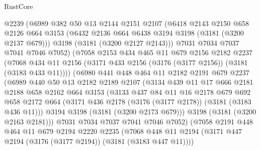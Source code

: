 \begin{lexlean}{RustCore}
\begin{coremodule}
            @2239
            (@6989
              @382
              @50
              @13
              @2144
              @2151
              @2107
              (@6418
                @2143
                @2150
                @658
                @2126
                @664
                @3153
                (@6432 @2136 @664 @6438 @3194 @3198 (@3181 (@3200 @2137 @679)))
                @3198
                (@3181 (@3200 @2127 @2143)))
              @7031
              @7034
              @7037
              @7041
              @7046
              @7052)
            (@7058
              @2153
              @434
              @465
              @11
              @679
              @2156
              @2182
              @2237
              (@7068
                @434
                @11
                @2156
                (@3171 @433 @2156 (@3176 (@3177 @2156)) (@3181 (@3183 @433 @11))))
              (@6980
                @441
                @448
                @464
                @11
                @2182
                @2191
                @679
                @2237
                (@6989
                  @440
                  @50
                  @13
                  @2182
                  @2189
                  @2107
                  (@3134
                    @439
                    @11
                    @17
                    @666
                    @2181
                    @2188
                    @658
                    @2162
                    @664
                    @3153
                    (@3133
                      @437
                      @84
                      @11
                      @16
                      @2178
                      @679
                      @692
                      @658
                      @2172
                      @664
                      (@3171 @436 @2178 (@3176 (@3177 @2178)) (@3181 (@3183 @436 @11)))
                      @3194
                      @3198
                      (@3181 (@3200 @2173 @679)))
                    @3198
                    (@3181 (@3200 @2163 @2181)))
                  @7031
                  @7034
                  @7037
                  @7041
                  @7046
                  @7052)
                (@7058
                  @2191
                  @448
                  @464
                  @11
                  @679
                  @2194
                  @2220
                  @2235
                  (@7068
                    @448
                    @11
                    @2194
                    (@3171 @447 @2194 (@3176 (@3177 @2194)) (@3181 (@3183 @447 @11))))

\end{coremodule}
\end{lexlean}
